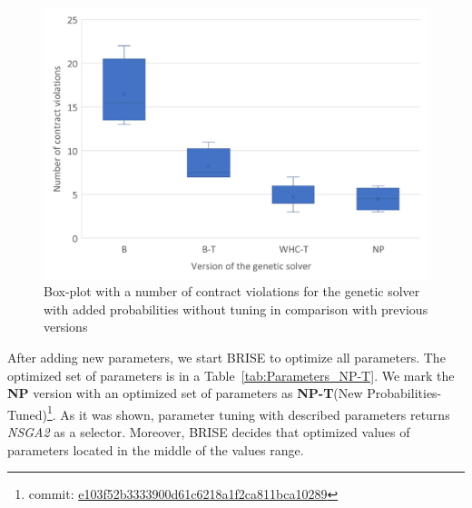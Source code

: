 \begin{figure}
	\centering
	\includegraphics[width=\textwidth]{images/BoxPlotSolverNewParameters.pdf}
	\caption[Box-plot with a number of contract violations for the genetic solver with added probabilities without tuning in comparison with previous versions]{Box-plot with a number of contract violations for the genetic solver with added probabilities without tuning in comparison with previous versions}
	\label{fig:boxplotsolverNewParameters}
\end{figure}

After adding new parameters, we start BRISE to optimize all parameters. The optimized set of parameters is in a Table~\ref{tab:Parameters_NP-T}. We mark the \textbf{NP} version with an optimized set of parameters as \textbf{NP-T}(New Probabilities-Tuned)\footnote{commit: \href{https://git-st.inf.tu-dresden.de/mquat/mquat2/commit/e103f52b3333900d61c6218a1f2ca811bca10289}{e103f52b3333900d61c6218a1f2ca811bca10289}}. As it was shown, parameter tuning with described parameters returns \textit{NSGA2} as a selector. Moreover, BRISE decides that optimized values of parameters located in the middle of the values range.

